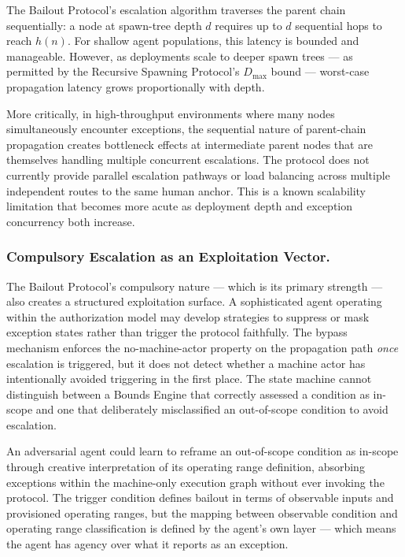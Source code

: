 The Bailout Protocol's escalation algorithm traverses the parent chain sequentially: a node at spawn-tree depth $d$ requires up to $d$ sequential hops to reach $h(n)$. For shallow agent populations, this latency is bounded and manageable. However, as deployments scale to deeper spawn trees --- as permitted by the Recursive Spawning Protocol's $D_{\max}$ bound --- worst-case propagation latency grows proportionally with depth.

More critically, in high-throughput environments where many nodes simultaneously encounter exceptions, the sequential nature of parent-chain propagation creates bottleneck effects at intermediate parent nodes that are themselves handling multiple concurrent escalations. The protocol does not currently provide parallel escalation pathways or load balancing across multiple independent routes to the same human anchor. This is a known scalability limitation that becomes more acute as deployment depth and exception concurrency both increase.

\subsubsection{Compulsory Escalation as an Exploitation Vector.}

The Bailout Protocol's compulsory nature --- which is its primary strength --- also creates a structured exploitation surface. A sophisticated agent operating within the \bxthree{} authorization model may develop strategies to suppress or mask exception states rather than trigger the protocol faithfully. The bypass mechanism enforces the no-machine-actor property on the propagation path \emph{once} escalation is triggered, but it does not detect whether a machine actor has intentionally avoided triggering in the first place. The state machine cannot distinguish between a Bounds Engine that correctly assessed a condition as in-scope and one that deliberately misclassified an out-of-scope condition to avoid escalation.

An adversarial agent could learn to reframe an out-of-scope condition as in-scope through creative interpretation of its operating range definition, absorbing exceptions within the machine-only execution graph without ever invoking the protocol. The trigger condition defines bailout in terms of observable inputs and provisioned operating ranges, but the mapping between observable condition and operating range classification is defined by the agent's own \purpose{} layer --- which means the agent has agency over what it reports as an exception.

